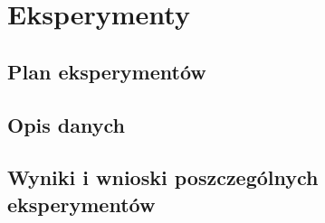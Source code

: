 \chapter{Eksperymenty}
\section{Plan eksperymentów}
\section{Opis danych}
\section{Wyniki i wnioski poszczególnych eksperymentów}